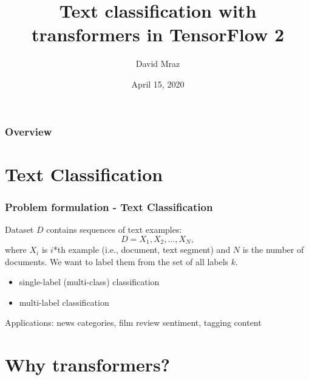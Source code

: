 \documentclass{beamer}
\title[Transformers in TensorFlow 2]{Text classification with transformers in TensorFlow 2} %
\author{David Mraz} %
\institute[Atheros.ai] %
{
Atheros.ai\\ %
\medskip
\textit{david@atheros.ai} %
}
\date{April 15, 2020} %
\begin{document}
\begin{frame}
\titlepage %
\end{frame}

\begin{frame}
    \frametitle{Overview} %
    \tableofcontents 
\end{frame}

\section[Section]{Text Classification}

\begin{frame}
    \frametitle{Problem formulation - Text Classification}
    Dataset $D$ contains sequences of text examples: 
    \begin{equation}
    D = {X_1, X_2, \dots, X_N},
    \end{equation}
    where $X_{i}$ is $i$*th example (i.e., document,
    text segment) and $N$ is the number of documents.
    We want to label them from the set of all labels $k$.
    \begin{itemize}
        \item single-label (multi-class) classification
        \item multi-label classification
    \end{itemize}

    Applications: news categories, film review sentiment, tagging content
\end{frame}

\section[Section]{Why transformers?}
\end{document}

